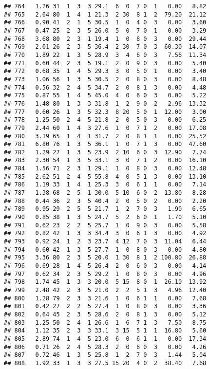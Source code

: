 \documentclass[
]{article}
\begin{document}
\begin{verbatim}
## 764   1.26 31  1  3  3 29.1  6  0  7 0  1   0.00   8.82
## 765   2.64 80  1  4  1 21.3  2 30  8 1  2  79.20  21.12
## 766   0.90 41  2  1  5 30.5  1  0  4 0  3   0.00   3.60
## 767   0.47 25  2  3  5 26.0  5  0  7 0  1   0.00   3.29
## 768   3.68 80  2  3  1 19.4  1  0  8 0  3   0.00  29.44
## 769   2.01 26  2  3  5 36.4  2 30  7 0  3  60.30  14.07
## 770   1.89 22  1  3  5 28.9  3  4  6 0  3   7.56  11.34
## 771   0.60 44  2  3  5 19.1  2  0  9 0  3   0.00   5.40
## 772   0.68 35  1  4  5 29.3  3  0  5 0  1   0.00   3.40
## 773   1.06 56  1  3  5 30.5  2  0  8 0  3   0.00   8.48
## 774   0.56 32  2  4  5 34.7  2  0  8 1  3   0.00   4.48
## 775   0.87 55  1  4  5 45.0  4  0  6 0  3   0.00   5.22
## 776   1.48 80  1  3  3 31.8  1  2  9 0  2   2.96  13.32
## 777   0.60 26  1  3  5 32.3  8 20  5 0  1  12.00   3.00
## 778   1.25 50  2  4  5 21.8  2  0  5 0  3   0.00   6.25
## 779   2.44 60  1  4  3 27.6  1  0  7 1  2   0.00  17.08
## 780   3.19 65  1  4  1 31.7  2  0  8 1  1   0.00  25.52
## 781   6.80 76  1  3  5 36.1  1  0  7 1  3   0.00  47.60
## 782   1.29 27  1  3  5 23.9  2 10  6 0  3  12.90   7.74
## 783   2.30 54  1  3  5 33.1  3  0  7 1  2   0.00  16.10
## 784   1.56 71  2  3  1 29.1  1  0  8 0  3   0.00  12.48
## 785   2.62 51  2  4  5 55.8  4  0  5 1  3   0.00  13.10
## 786   1.19 33  1  4  1 25.3  3  0  6 1  1   0.00   7.14
## 787   1.38 68  2  5  1 30.0  5 10  6 0  2  13.80   8.28
## 788   0.44 36  2  3  5 40.4  2  0  5 0  2   0.00   2.20
## 789   0.95 29  2  5  5 21.7  1  2  7 0  3   1.90   6.65
## 790   0.85 38  1  3  5 24.7  5  2  6 0  1   1.70   5.10
## 791   0.62 23  2  2  5 25.7  1  0  9 0  3   0.00   5.58
## 792   0.82 42  1  3  3 34.4  3  0  6 1  3   0.00   4.92
## 793   0.92 24  1  2  3 23.7  4 12  7 0  3  11.04   6.44
## 794   0.60 42  1  3  5 27.7  1  0  8 0  3   0.00   4.80
## 795   3.36 80  2  3  5 20.0  1 30  8 1  2 100.80  26.88
## 796   0.69 28  1  4  5 26.4  2  0  6 0  3   0.00   4.14
## 797   0.62 34  2  3  5 29.2  1  0  8 0  3   0.00   4.96
## 798   1.74 45  1  3  3 20.0  5 15  8 0  1  26.10  13.92
## 799   2.48 42  2  3  5 21.0  2  2  5 1  3   4.96  12.40
## 800   1.28 79  2  3  3 21.6  1  0  6 1  1   0.00   7.68
## 801   0.42 27  2  2  5 27.4  1  0  8 0  3   0.00   3.36
## 802   0.64 45  2  3  5 28.6  2  0  8 1  3   0.00   5.12
## 803   1.25 50  2  4  1 26.6  1  6  7 1  3   7.50   8.75
## 804   1.12 35  2  3  3 33.1  3 15  5 1  1  16.80   5.60
## 805   2.89 74  1  4  5 23.0  6  0  6 1  1   0.00  17.34
## 806   0.71 26  2  4  5 28.3  2  0  6 0  3   0.00   4.26
## 807   0.72 46  1  3  5 25.8  1  2  7 0  3   1.44   5.04
## 808   1.92 33  1  3  3 27.5 15 20  4 0  2  38.40   7.68

\end{verbatim}
\end{document}
